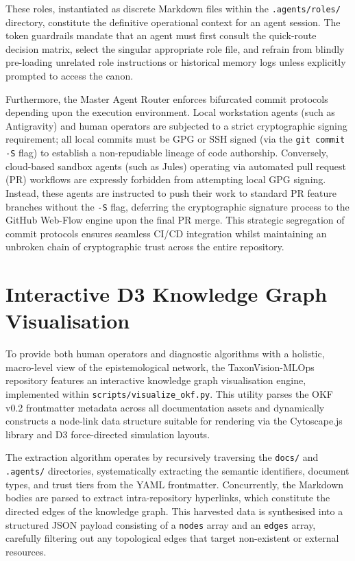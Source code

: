 These roles, instantiated as discrete Markdown files within the \texttt{.agents/roles/} directory, constitute the definitive operational context for an agent session. The token guardrails mandate that an agent must first consult the quick-route decision matrix, select the singular appropriate role file, and refrain from blindly pre-loading unrelated role instructions or historical memory logs unless explicitly prompted to access the canon.

Furthermore, the Master Agent Router enforces bifurcated commit protocols depending upon the execution environment. Local workstation agents (such as Antigravity) and human operators are subjected to a strict cryptographic signing requirement; all local commits must be GPG or SSH signed (via the \texttt{git commit -S} flag) to establish a non-repudiable lineage of code authorship. Conversely, cloud-based sandbox agents (such as Jules) operating via automated pull request (PR) workflows are expressly forbidden from attempting local GPG signing. Instead, these agents are instructed to push their work to standard PR feature branches without the \texttt{-S} flag, deferring the cryptographic signature process to the GitHub Web-Flow engine upon the final PR merge. This strategic segregation of commit protocols ensures seamless CI/CD integration whilst maintaining an unbroken chain of cryptographic trust across the entire repository.

\section{Interactive D3 Knowledge Graph Visualisation}
\label{sec:interactive_d3_knowledge_graph}

To provide both human operators and diagnostic algorithms with a holistic, macro-level view of the epistemological network, the TaxonVision-MLOps repository features an interactive knowledge graph visualisation engine, implemented within \texttt{scripts/visualize\_okf.py}. This utility parses the OKF v0.2 frontmatter metadata across all documentation assets and dynamically constructs a node-link data structure suitable for rendering via the Cytoscape.js library and D3 force-directed simulation layouts.

The extraction algorithm operates by recursively traversing the \texttt{docs/} and \texttt{.agents/} directories, systematically extracting the semantic identifiers, document types, and trust tiers from the YAML frontmatter. Concurrently, the Markdown bodies are parsed to extract intra-repository hyperlinks, which constitute the directed edges of the knowledge graph. This harvested data is synthesised into a structured JSON payload consisting of a \texttt{nodes} array and an \texttt{edges} array, carefully filtering out any topological edges that target non-existent or external resources.

